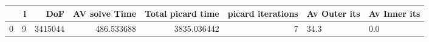 \begin{tabular}{lrrrrrll}
\toprule
{} &  l &      DoF &  AV solve Time &  Total picard time &  picard iterations & Av Outer its & Av Inner its \\
\midrule
0 &  9 &  3415044 &     486.533688 &        3835.036442 &                  7 &         34.3 &          0.0 \\
\bottomrule
\end{tabular}
